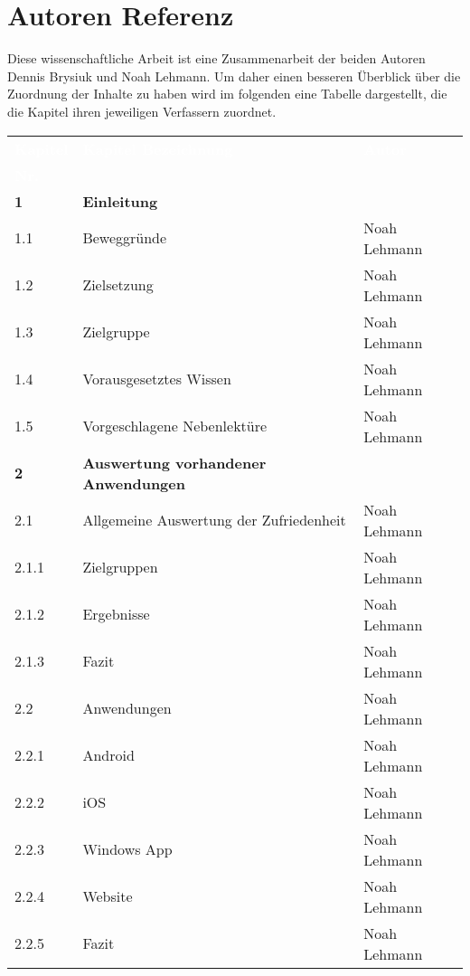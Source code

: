 \section*{Autoren Referenz}

Diese wissenschaftliche Arbeit ist eine Zusammenarbeit der beiden Autoren Dennis Brysiuk und Noah Lehmann. Um daher einen besseren Überblick über die Zuordnung der Inhalte zu haben wird im folgenden eine Tabelle dargestellt, die die Kapitel ihren jeweiligen Verfassern zuordnet.

\begin{table}[H]
\begin{center}
  \begin{tabular}{| l | l | l |}
 
\hline
\rowcolor{Gray}
\textcolor{white}{\textbf{Kapitel}} & \textcolor{white}{\textbf{Kapitel Bezeichnung}} & \textcolor{white}{\textbf{Autor}} \\
\rowcolor{Gray}
\textcolor{white}{\textbf{Nr.}} 	&  												  & \\  

\hline    
\rowcolor{LGray} 						
\textbf{1}		& \textbf{Einleitung}	&  				\\
\hline
1.1		& Beweggründe					& Noah Lehmann	\\
\hline
1.2		& Zielsetzung					& Noah Lehmann	\\
\hline
1.3		& Zielgruppe					& Noah Lehmann	\\
\hline
1.4		& Vorausgesetztes Wissen		& Noah Lehmann	\\
\hline
1.5		& Vorgeschlagene Nebenlektüre	& Noah Lehmann	\\

\hline    
\rowcolor{LGray} 						
\textbf{2}		& \textbf{Auswertung vorhandener Anwendungen} &  				\\
\hline
2.1		& Allgemeine Auswertung der Zufriedenheit	& Noah Lehmann	\\
\hline
2.1.1	& Zielgruppen								& Noah Lehmann	\\
\hline
2.1.2	& Ergebnisse								& Noah Lehmann	\\
\hline
2.1.3	& Fazit										& Noah Lehmann	\\
\hline
2.2		& Anwendungen								& Noah Lehmann	\\
\hline
2.2.1	& Android									& Noah Lehmann	\\
\hline
2.2.2	& iOS										& Noah Lehmann	\\
\hline
2.2.3	& Windows App								& Noah Lehmann	\\
\hline
2.2.4	& Website									& Noah Lehmann	\\
\hline
2.2.5	& Fazit										& Noah Lehmann	\\


\end{tabular}
\end{center}
\end{table}
